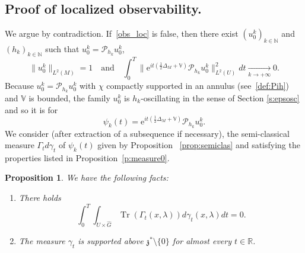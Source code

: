 \documentclass[10pt]{amsart}
\let\mathcal\mathscr
\newcommand{\rme}{\mathrm{e}}
\DeclareMathOperator{\Tr}{Tr}
\theoremstyle{plain}
\newtheorem{proposition}[theorem]{Proposition}
\theoremstyle{definition}
\def\R{{\mathbb R}}
\def\N{{\mathbb N}}
\def\bbV{{\mathbb V}}
\newcommand{\Tend}[2]{\mathbin{\mathop{\longrightarrow}\limits_{#1\to#2}}}
\begin{document}
\subsection{Proof of localized observability.}\label{sec:proof}

We argue by contradiction. If~\eqref{obs_loc} is false, then there exist $(u_0^k)_{k\in\N}$ and $(h_k)_{k\in\N}$ such that $u_0^k= \mathcal{P}_{h_k} u_0^k$,
\begin{equation}\label{hyp}
\| u^k_0\|_{L^2(M)}=1\quad \mbox{and}\quad \int_0^T \bigl\| \rme^{it(\frac12 \Delta_M+\bbV)} \mathcal{P}_{h_k} u_0^k\bigr\|_{L^2(U)}^2 dt\Tend{k}{ +\infty} 0.
\end{equation}
Because $u_0^k= \mathcal{P}_{h_k} u_0^k$ with $\chi$ compactly supported in an annulus (see~\eqref{def:Pih}) and $\bbV$ is bounded, the family $u_0^k$ is
$h_k$-oscillating in the sense of Section \ref{s:epsosc}
and so it is for
\[
\psi_k(t)= \rme^{it(\frac12 \Delta_M+\bbV)} \mathcal{P}_{h_k} u_0^k.
\]
We consider (after extraction of a subsequence if necessary), the semi-classical measure $\Gamma_t d\gamma_t$ of $\psi_k(t)$ given by Proposition~ \ref{prop:semiclas} and satisfying the properties listed in Proposition~\ref{p:measure0}.

\begin{proposition}\label{p:pmeasure}
We have the following facts:
\begin{enumerate}
\item\label{p:pmeasure1}
There holds
\begin{equation} \label{e:nullityoverU}
\int_0^T \int_{U\times \widehat G} \Tr (\Gamma_t(x,\lambda)) d\gamma_t (x,\lambda)dt=0.
\end{equation}
\item\label{p:pmeasure2} The measure $\gamma_t$ is supported above $\mathfrak z^*\setminus \{0\}$ for almost every $t\in\R$.
\end{enumerate}
\end{proposition}
\end{document}
